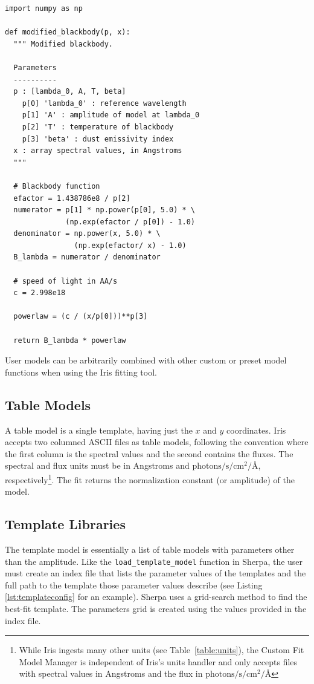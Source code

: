 \documentclass[preprint,authoryear,5p]{elsarticle}
\begin{document}
\begin{lstlisting}[style=python,
	caption={Example of a user-defined model that
can be dynamically loaded into Iris. The code, written as a Python function, 
implements a modified blackbody and can be combined 
in Iris with other built-in and custom components. Backslashes indicate line 
continuations.},
	label=lst:user_model_example]
import numpy as np

def modified_blackbody(p, x):
  """ Modified blackbody.

  Parameters
  ----------
  p : [lambda_0, A, T, beta]
    p[0] 'lambda_0' : reference wavelength
    p[1] 'A' : amplitude of model at lambda_0
    p[2] 'T' : temperature of blackbody
    p[3] 'beta' : dust emissivity index
  x : array spectral values, in Angstroms
  """

  # Blackbody function
  efactor = 1.438786e8 / p[2]
  numerator = p[1] * np.power(p[0], 5.0) * \
              (np.exp(efactor / p[0]) - 1.0)
  denominator = np.power(x, 5.0) * \
                (np.exp(efactor/ x) - 1.0)
  B_lambda = numerator / denominator

  # speed of light in AA/s
  c = 2.998e18

  powerlaw = (c / (x/p[0]))**p[3]

  return B_lambda * powerlaw
\end{lstlisting}

User models can be arbitrarily combined with other custom or preset model
functions when using the Iris fitting tool.

\subsection{Table Models} A table model is a single template, having just the
$x$ and $y$ coordinates. Iris accepts two columned ASCII files as table models,
following the convention where the first column is the spectral values
and the second contains the fluxes. The spectral and flux units must be in Angstroms
and $\mathrm{photons}/\mathrm{s}/\mathrm{cm}^{2}/\mbox{\AA}$, respectively\footnote{
While Iris ingests many other units (see Table~\ref{table:units}), the Custom Fit Model
Manager is independent of Iris's units handler and only accepts files with spectral 
values in Angstroms and the flux in 
$\mathrm{photons}/\mathrm{s}/\mathrm{cm}^{2}/\mbox{\AA}$}.
The fit returns the normalization constant (or amplitude) of the model.

\begin{sloppypar}
\subsection{Template Libraries} The template model is essentially a list of
table models with parameters other than the amplitude. Like the
\texttt{load\_template\_model} function in Sherpa, the user must create an index
file that lists the parameter values of the templates and the full path to the
template those parameter values describe (see Listing \ref{lst:templateconfig}
for an example). Sherpa uses a grid-search method to find the best-fit template.
The parameters grid is created using the values provided in the index file.
\end{sloppypar}
\end{document}
